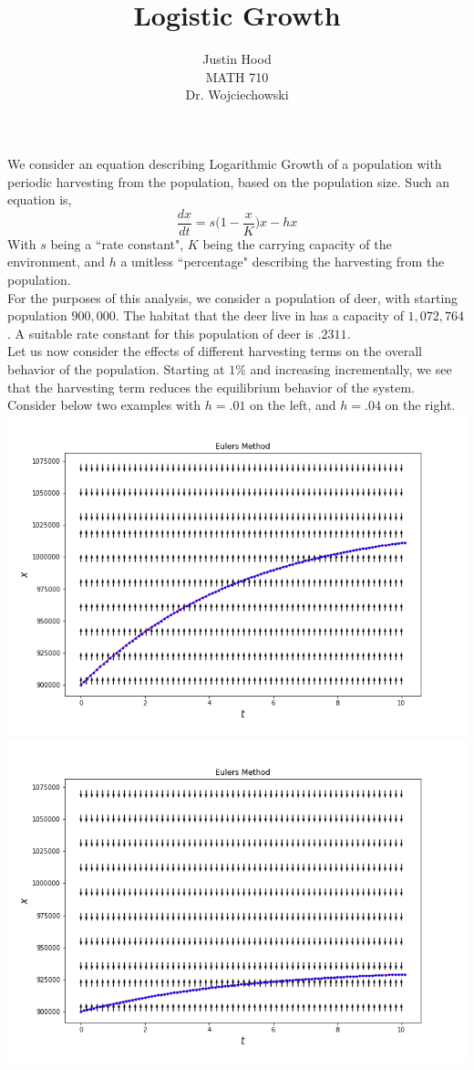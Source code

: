 \documentclass[letterpaper,10pt]{article}
\title{Logistic Growth}
\author{Justin Hood\\
MATH 710\\
Dr. Wojciechowski}
\begin{document}
\maketitle
\newpage
We consider an equation describing Logarithmic Growth of a population with periodic harvesting from the population, based on the population size. Such an equation is,
\[\frac{dx}{dt}=s\bigg(1-\frac{x}{K}\bigg)x-hx\]
With $s$ being a ``rate constant", $K$ being the carrying capacity of the environment, and $h$ a unitless ``percentage" describing the harvesting from the population.\\
For the purposes of this analysis, we consider a population of deer, with starting population $900,000$. The habitat that the deer live in has a capacity of $1,072,764$. A suitable rate constant for this population of deer is $.2311$.\\
Let us now consider the effects of different harvesting terms on the overall behavior of the population. Starting at $1\%$ and increasing incrementally, we see that the harvesting term reduces the equilibrium behavior of the system. Consider below two examples with $h=.01$ on the left, and $h=.04$ on the right.\\
\includegraphics[scale=.4]{3a1.png}
\includegraphics[scale=.4]{3a4.png}
\end{document}
